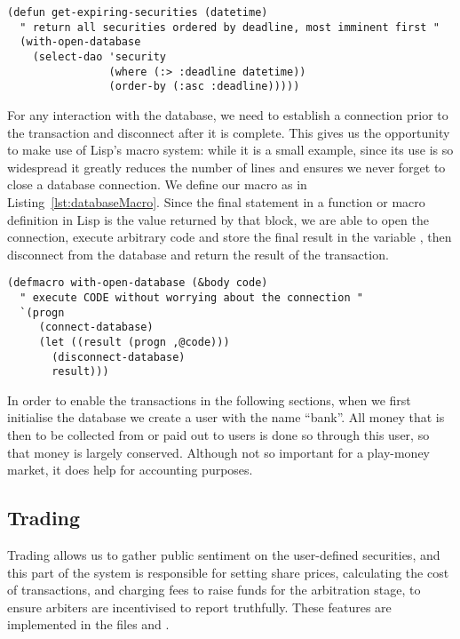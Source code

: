 \begin{lstlisting}[float,
	label={lst:retrieveExpiring},
	caption={Retrieving active markets using Mito and SXQL}]
(defun get-expiring-securities (datetime)
  " return all securities ordered by deadline, most imminent first "
  (with-open-database
    (select-dao 'security
                (where (:> :deadline datetime))
                (order-by (:asc :deadline)))))
\end{lstlisting}

For any interaction with the database, we need to establish a connection prior
to the transaction and disconnect after it is complete. This gives us the
opportunity to make use of Lisp's macro system: while it is a small example,
since its use is so widespread it greatly reduces the number of lines and
ensures we never forget to close a database connection. We define our macro
 as in Listing~\ref{lst:databaseMacro}. Since the
final statement in a function or macro definition in Lisp is the value returned
by that block, we are able to open the connection, execute arbitrary code and
store the final result in the variable , then disconnect from the
database and return the result of the transaction.

\begin{lstlisting}[float,
	label={lst:databaseMacro},
	caption={Defining our \code{with-open-database} macro}]
(defmacro with-open-database (&body code)
  " execute CODE without worrying about the connection "
  `(progn
     (connect-database)
     (let ((result (progn ,@code)))
       (disconnect-database)
       result)))
\end{lstlisting}

In order to enable the transactions in the following sections, when we first
initialise the database we create a user with the name ``bank''. All money that
is then to be collected from or paid out to users is done so through this user,
so that money is largely conserved. Although not so important for a play-money
market, it does help for accounting purposes.

\subsection{Trading}

\label{sec:trading}

Trading allows us to gather public sentiment on the user-defined securities,
and this part of the system is responsible for setting share prices,
calculating the cost of transactions, and charging fees to raise funds for the
arbitration stage, to ensure arbiters are incentivised to report truthfully.
These features are implemented in the files  and
.

